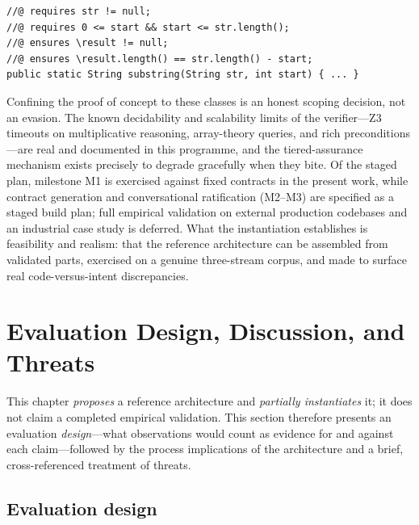\begin{lstlisting}[style=code,caption={A representative green target: a null-and-bounds contract of the class the inferrer already discharges, used as the fixed contract for the M1 synthesis loop.},label={lst:a5-target}]
//@ requires str != null;
//@ requires 0 <= start && start <= str.length();
//@ ensures \result != null;
//@ ensures \result.length() == str.length() - start;
public static String substring(String str, int start) { ... }
\end{lstlisting}

Confining the proof of concept to these classes is an honest scoping decision, not an evasion. The known decidability and scalability limits of the verifier---Z3 timeouts on multiplicative reasoning, array-theory queries, and rich preconditions---are real and documented in this programme, and the tiered-assurance mechanism exists precisely to degrade gracefully when they bite. Of the staged plan, milestone M1 is exercised against fixed contracts in the present work, while contract generation and conversational ratification (M2--M3) are specified as a staged build plan; full empirical validation on external production codebases and an industrial case study is deferred. What the instantiation establishes is feasibility and realism: that the reference architecture can be assembled from validated parts, exercised on a genuine three-stream corpus, and made to surface real code-versus-intent discrepancies.

\section{Evaluation Design, Discussion, and Threats}\label{sec:a5-evaluation}\label{sec:a5-discussion}

This chapter \emph{proposes} a reference architecture and \emph{partially instantiates} it; it does not claim a completed empirical validation. This section therefore presents an evaluation \emph{design}---what observations would count as evidence for and against each claim---followed by the process implications of the architecture and a brief, cross-referenced treatment of threats.

\subsection{Evaluation design}\label{subsec:a5-evaldesign}

